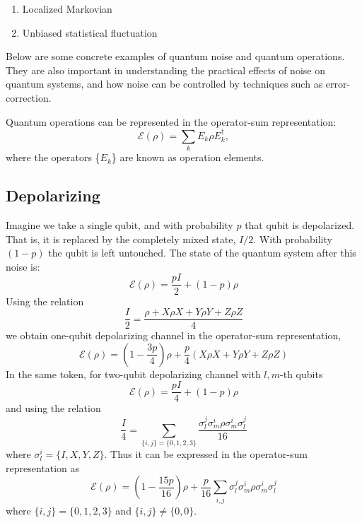 \documentclass[11pt, oneside]{article}   	%
\begin{document}
\begin{enumerate}
\item Localized Markovian
\item Unbiased statistical fluctuation
\end{enumerate}

Below are some concrete examples of quantum noise and quantum operations. 
They are also important in understanding the practical effects of noise on quantum systems, and how noise can be controlled by techniques such as error-correction.

Quantum operations can be represented in the operator-sum representation:
\begin{equation}
\mathcal{E} (\rho) = \sum_k E_k \rho E^{\dagger}_k, 
\end{equation}
where the operators \{$E_k$\} are known as operation elements.

\subsection{Depolarizing}
Imagine we take a single qubit, and with probability $p$ that qubit is depolarized. 
That is, it is replaced by the completely mixed state, $I /2$. With probability $(1-p)$ the qubit is left untouched. 
The state of the quantum system after this noise is:
\begin{equation}
\mathcal{E} (\rho) = \frac{p I}{2} + (1-p) \rho
\end{equation}
Using the relation
\begin{equation}
\frac{I}{2} = \frac{\rho + X \rho X + Y \rho Y + Z \rho Z}{4}
\end{equation}
we obtain one-qubit depolarizing channel in the operator-sum representation, 
\begin{equation}
\mathcal{E} (\rho) =\left({1 - \frac{3p}{4}} \right) \rho + \frac{p}{4} (X \rho X + Y \rho Y + Z \rho Z)
\end{equation}
In the same token, for two-qubit depolarizing channel with $l,m$-th qubits
\begin{equation}
\mathcal{E} (\rho) = \frac{p I}{4} + (1-p) \rho
\end{equation}
and using the relation
\begin{equation}
\frac{I}{4} = \sum_{\{i, j\} = \{0, 1, 2, 3 \}} \frac{\sigma^j_l \sigma^i_m \rho \sigma^i_m \sigma^j_l}{16} 
\end{equation}
where $\sigma^i_l = \{I, X, Y, Z \}$.
Thus it can be expressed in the operator-sum representation as
\begin{equation}
\mathcal{E} (\rho) =\left({1 - \frac{15p}{16}} \right) \rho + \frac{p}{16}  \sum_{i,j} \sigma^j_l \sigma^i_m \rho \sigma^i_m \sigma^j_l
\end{equation}
where $\{i, j\} = \{0, 1, 2, 3 \}$ and $\{i, j\} \ne \{0, 0 \}$.
\end{document}
